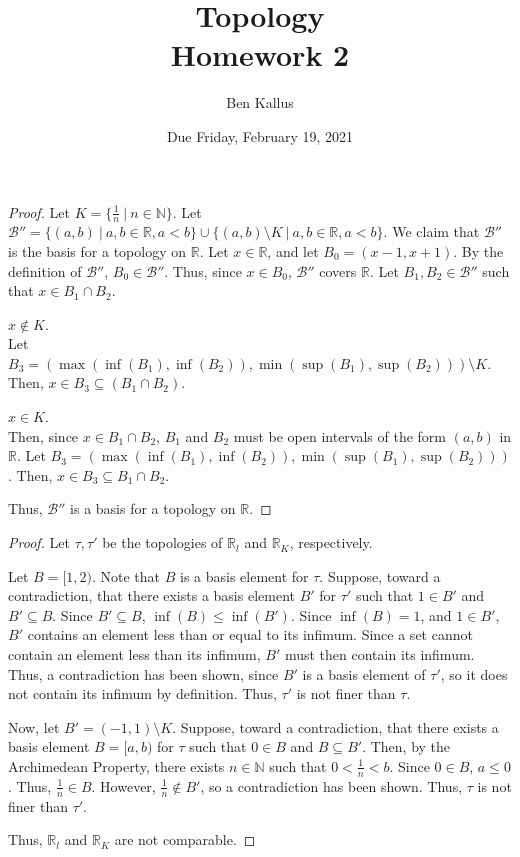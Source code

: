 \documentclass{article}
\date{Due Friday, February 19, 2021}
\author{Ben Kallus}
\title{Topology \\ Homework 2}
\newcommand{\R}{\mathbb R}
\newcommand{\N}{\mathbb N}
\newcommand{\B}{\mathcal B}
\begin{document}
\pagecolor{black}
\color{white}
\maketitle

\begin{proof}
    Let $K = \{\frac1n ~|~ n \in \N\}$.
    Let $\B'' = \{(a,b) ~|~ a,b \in \R, a < b\} \cup \{(a,b) \setminus K ~|~ a,b \in \R, a < b\}$.
    We claim that $\B''$ is the basis for a topology on $\R$.
    Let $x \in \R$, and let $B_0 = (x-1,x+1)$.
    By the definition of $\B''$, $B_0 \in \B''$.
    Thus, since $x \in B_0$, $\B''$ covers $\R$.
    Let $B_1, B_2 \in \B''$ such that $x \in B_1 \cap B_2$.
    
     $x \notin K$. \\
    \indent
    Let $B_3 = (\max(\inf(B_1), \inf(B_2)), \min(\sup(B_1), \sup(B_2))) \setminus K$.
    Then, $x \in B_3 \subseteq (B_1 \cap B_2)$.
    
     $x \in K$. \\
    \indent
    Then, since $x \in B_1 \cap B_2$, $B_1$ and $B_2$ must be open intervals of the form $(a,b)$ in $\R$.
    Let $B_3 = (\max(\inf(B_1), \inf(B_2)), \min(\sup(B_1), \sup(B_2)))$.
    Then, $x \in B_3 \subseteq B_1 \cap B_2$.

    Thus, $\B''$ is a basis for a topology on $\R$.
\end{proof}

\bigskip
{}
\begin{proof}
    Let $\tau, \tau'$ be the topologies of $\R_l$ and $\R_K$, respectively.

    Let $B = [1, 2)$.
    Note that $B$ is a basis element for $\tau$.
    Suppose, toward a contradiction, that there exists a basis element $B'$ for $\tau'$ such that $1 \in B'$ and $B' \subseteq B$.
    Since $B' \subseteq B$, $\inf(B) \leq \inf(B')$.
    Since $\inf(B) = 1$, and $1 \in B'$, $B'$ contains an element less than or equal to its infimum.
    Since a set cannot contain an element less than its infimum, $B'$ must then contain its infimum.
    Thus, a contradiction has been shown, since $B'$ is a basis element of $\tau'$, so it does not contain its infimum by definition.
    Thus, $\tau'$ is not finer than $\tau$.

    Now, let $B' = (-1,1) \setminus K$.
    Suppose, toward a contradiction, that there exists a basis element $B = [a,b)$ for $\tau$ such that $0 \in B$ and $B \subseteq B'$.
    Then, by the Archimedean Property, there exists $n \in \N$ such that $0 < \frac1n < b$.
    Since $0 \in B$, $a \leq 0$.
    Thus, $\frac1n \in B$.
    However, $\frac1n \notin B'$, so a contradiction has been shown.
    Thus, $\tau$ is not finer than $\tau'$.

    Thus, $\R_l$ and $\R_K$ are not comparable.
\end{proof}
\end{document}
